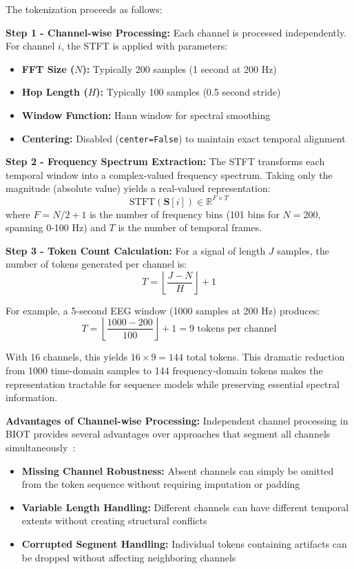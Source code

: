The tokenization proceeds as follows:

\textbf{Step 1 - Channel-wise Processing:} Each channel is processed independently. For channel $i$, the \ac{STFT} is applied with parameters:
\begin{itemize}
    \item \textbf{FFT Size ($N$):} Typically 200 samples (1 second at 200 Hz)
    \item \textbf{Hop Length ($H$):} Typically 100 samples (0.5 second stride)
    \item \textbf{Window Function:} Hann window for spectral smoothing
    \item \textbf{Centering:} Disabled (\texttt{center=False}) to maintain exact temporal alignment
\end{itemize}

\textbf{Step 2 - Frequency Spectrum Extraction:} The \ac{STFT} transforms each temporal window into a complex-valued frequency spectrum. Taking only the magnitude (absolute value) yields a real-valued representation:
$$\text{STFT}(\mathbf{S}[i]) \in \mathbb{R}^{F \times T}$$
where $F = N/2 + 1$ is the number of frequency bins (101 bins for $N=200$, spanning 0-100 Hz) and $T$ is the number of temporal frames.

\textbf{Step 3 - Token Count Calculation:} For a signal of length $J$ samples, the number of tokens generated per channel is:
$$T = \left\lfloor \frac{J - N}{H} \right\rfloor + 1$$

For example, a 5-second \ac{EEG} window (1000 samples at 200 Hz) produces:
$$T = \left\lfloor \frac{1000 - 200}{100} \right\rfloor + 1 = 9 \text{ tokens per channel}$$

With 16 channels, this yields $16 \times 9 = 144$ total tokens. This dramatic reduction from 1000 time-domain samples to 144 frequency-domain tokens makes the representation tractable for sequence models while preserving essential spectral information.

\textbf{Advantages of Channel-wise Processing:} Independent channel processing in \ac{BIOT} provides several advantages over approaches that segment all channels simultaneously~\cite{yang2023biot}:
\begin{itemize}
    \item \textbf{Missing Channel Robustness:} Absent channels can simply be omitted from the token sequence without requiring imputation or padding~\cite{yang2023biot}
    \item \textbf{Variable Length Handling:} Different channels can have different temporal extents without creating structural conflicts~\cite{yang2023biot}
    \item \textbf{Corrupted Segment Handling:} Individual tokens containing artifacts can be dropped without affecting neighboring channels~\cite{yang2023biot}
\end{itemize}

